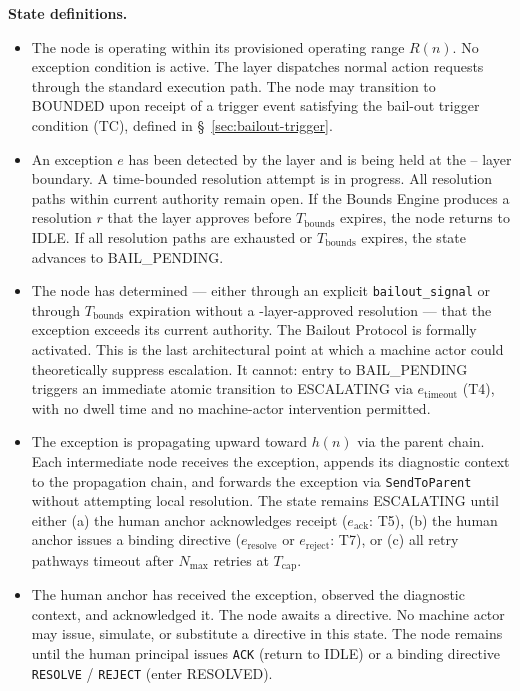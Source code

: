 \medskip
\noindent\textbf{State definitions.}

\begin{itemize}\itemsep=0pt
\item[\textbf{IDLE.}] The node is operating within its provisioned operating range $R(n)$. No exception condition is active. The \fact{} layer dispatches normal action requests through the standard execution path. The node may transition to BOUNDED upon receipt of a trigger event satisfying the bail-out trigger condition (TC), defined in \S~\ref{sec:bailout-trigger}.

\item[\textbf{BOUNDED.}] An exception $e$ has been detected by the \bounds{} layer and is being held at the \bounds{}--\fact{} layer boundary. A time-bounded resolution attempt is in progress. All resolution paths within current authority remain open. If the Bounds Engine produces a resolution $r$ that the \fact{} layer approves before $T_{\text{bounds}}$ expires, the node returns to IDLE. If all resolution paths are exhausted or $T_{\text{bounds}}$ expires, the state advances to BAIL\_PENDING.

\item[\textbf{BAIL\_PENDING.}] The node has determined — either through an explicit \texttt{bailout\_signal} or through $T_{\text{bounds}}$ expiration without a \fact-layer-approved resolution — that the exception exceeds its current authority. The Bailout Protocol is formally activated. This is the last architectural point at which a machine actor could theoretically suppress escalation. It cannot: entry to BAIL\_PENDING triggers an immediate atomic transition to ESCALATING via $e_{\text{timeout}}$ (T4), with no dwell time and no machine-actor intervention permitted.

\item[\textbf{ESCALATING.}] The exception is propagating upward toward $h(n)$ via the parent chain. Each intermediate node receives the exception, appends its diagnostic context to the propagation chain, and forwards the exception via \texttt{SendToParent} without attempting local resolution. The state remains ESCALATING until either (a) the human anchor acknowledges receipt ($e_{\text{ack}}$: T5), (b) the human anchor issues a binding directive ($e_{\text{resolve}}$ or $e_{\text{reject}}$: T7), or (c) all retry pathways timeout after $N_{\max}$ retries at $T_{\text{cap}}$.

\item[\textbf{HUMAN\_ACKNOWLEDGED.}] The human anchor has received the exception, observed the diagnostic context, and acknowledged it. The node awaits a directive. No machine actor may issue, simulate, or substitute a directive in this state. The node remains until the human principal issues \texttt{ACK} (return to IDLE) or a binding directive \texttt{RESOLVE} / \texttt{REJECT} (enter RESOLVED).


\end{itemize}
